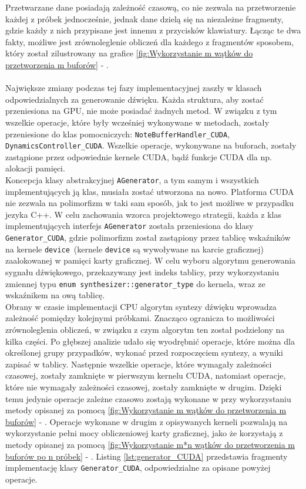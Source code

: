Przetwarzane dane posiadają zależność czasową, co nie zezwala na przetworzenie każdej z próbek jednocześnie, jednak dane dzielą się na niezależne fragmenty, gdzie każdy z nich przypisane jest innemu z przycisków klawiatury. Łącząc te dwa fakty, możliwe jest zrównoleglenie obliczeń dla każdego z fragmentów sposobem, który został zilustrowany na grafice \ref{fig:Wykorzystanie m wątków do przetworzenia m buforów} - .
\\\\
Największe zmiany podczas tej fazy implementacyjnej zaszły w klasach odpowiedzialnych za generowanie dźwięku. Każda struktura, aby zostać przeniesiona na GPU, nie może posiadać żadnych metod. W związku z tym wszelkie operacje, które były wcześniej wykonywane w metodach, zostały przeniesione do klas pomocniczych: \texttt{NoteBufferHandler\_CUDA}, \texttt{DynamicsController\_CUDA}. Wszelkie operacje, wykonywane na buforach, zostały zastąpione przez odpowiednie kernele CUDA, bądź funkcje CUDA dla np. alokacji pamięci. 
\\
Koncepcja klasy abstrakcyjnej \texttt{AGenerator}, a tym samym i wszystkich implementujących ją klas, musiała zostać utworzona na nowo. Platforma CUDA nie zezwala na polimorfizm w taki sam sposób, jak to jest możliwe w przypadku jezyka C++. W celu zachowania wzorca projektowego strategii, każda z klas implementujących interfejs \texttt{AGenerator} została przeniesiona do klasy \texttt{Generator\_CUDA}, gdzie polimorfizm został zastąpiony przez tablicę wskaźników na kernele \texttt{device}\ (kernele \texttt{device} są wywoływane na karcie graficznej) zaalokowanej w pamięci karty graficznej. W celu wyboru algorytmu generowania sygnału dźwiękowego, przekazywany jest indeks tablicy, przy wykorzystaniu zmiennej typu \texttt{enum synthesizer::generator\_type} do kernela, wraz ze wskaźnikem na ową tablicę.
\\
Obrany w czasie implementacji CPU algorytm syntezy dźwięku wprowadza zależność pomiędzy kolejnymi próbkami. Znacząco ogranicza to możliwości zrównoleglenia obliczeń, w związku z czym algorytm ten został podzielony na kilka części. Po głębszej analizie udało się wyodrębnić operacje, które można dla określonej grupy przypadków, wykonać przed rozpoczęciem syntezy, a wyniki zapisać w tablicy. Następnie wszelkie operacje, które wymagały zależności czasowej, zostały zamknięte w pierwszym kernelu CUDA, natomiast operacje, które nie wymagały zależności czasowej, zostały zamknięte w drugim. Dzięki temu jedynie operacje zależne czasowo zostają wykonane w przy wykorzystaniu metody opisanej za pomocą \ref{fig:Wykorzystanie m wątków do przetworzenia m buforów} - . Operacje wykonane w drugim z opisywanych kerneli pozwalają na wykorzystanie pełni mocy obliczeniowej karty graficznej, jako że korzystają z metody opisanej za pomocą \ref{fig:Wykorzystanie m*n wątków do przetworzenia m buforów po n próbek} - . Listing \ref{lst:generator_CUDA} przedstawia fragmenty implementację klasy \texttt{Generator\_CUDA}, odpowiedzialne za opisane powyżej operacje. 

